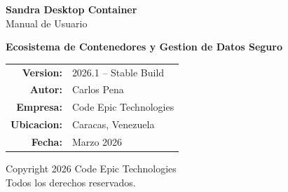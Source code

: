 \thispagestyle{empty}

\vspace*{3cm}

\begin{center}
    {\Huge \textbf{\textcolor{sandraDark}{Sandra Desktop Container}}}\\[0.5cm]
    {\Large \textcolor{sandraGray}{Manual de Usuario}}\\[2cm]
    
    
    \vspace{1.5cm}
    
    {\large \textbf{Ecosistema de Contenedores y Gestion de Datos Seguro}}\\[3cm]
    
    \begin{minipage}{0.7\textwidth}
        \begin{tabular}{rl}
            \textbf{Version:} & 2026.1 -- Stable Build \\[0.5em]
            \textbf{Autor:} & Carlos Pena \\[0.5em]
            \textbf{Empresa:} & Code Epic Technologies \\[0.5em]
            \textbf{Ubicacion:} & Caracas, Venezuela \\[0.5em]
            \textbf{Fecha:} & Marzo 2026 \\
        \end{tabular}
    \end{minipage}
    
    \vspace{3cm}
    
\end{center}

\vfill

\begin{center}
    \small
    \textcolor{sandraGray}{
        Copyright 2026 Code Epic Technologies\\
        Todos los derechos reservados.
    }
\end{center}

\newpage
